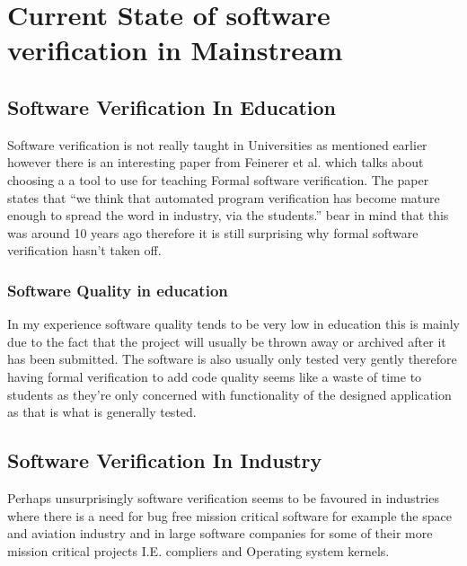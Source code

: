 \documentclass[a4paper,12pt]{scrartcl}
\begin{document}
	\section{Current State of software verification in Mainstream}
	{
		\subsection{Software Verification In Education}
		{
			Software verification is not really taught in Universities as mentioned earlier however there is an interesting paper from Feinerer et al. \cite{Feinerer2008} which talks about choosing a a tool to use for teaching Formal software verification. The paper states that \enquote{we think that automated program verification has become mature enough to spread the word in industry, via the students.}\cite{Feinerer2008} bear in mind that this was around 10 years ago therefore it is still surprising why formal software verification hasn't taken off.
			\subsubsection{Software Quality in education}
			{
				In my experience software quality tends to be very low in education this is mainly due to the fact that the project will usually be thrown away or archived after it has been submitted. The software is also usually only tested very gently therefore having formal verification to add code quality seems like a waste of time to students as they're only concerned with functionality of the designed application as that is what is generally tested.
			}
		}
		\subsection{Software Verification In Industry}
		{
			Perhaps unsurprisingly software verification seems to be favoured in industries where there is a need for bug free mission critical software for example the space and aviation industry\cite{Feldt2010} and in large software companies for some of their more mission critical projects\cite{Hunt2005} I.E. compliers and Operating system kernels. 
		}
	}
\end{document}
